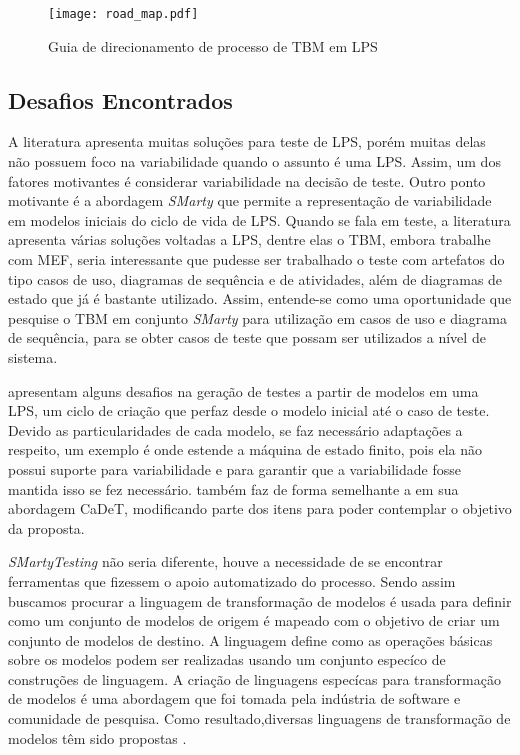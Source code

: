 \begin{landscape}
	
	\begin{figure}[htb]
		\centering
		\texttt{[image: road\_map.pdf]}
		\caption{Guia de direcionamento de processo de TBM em LPS}
		\label{fig:roadmap}
	\end{figure}
	
\end{landscape}




\subsection{Desafios Encontrados}
A literatura apresenta muitas soluções para teste de LPS, porém muitas delas não possuem foco na variabilidade quando o assunto é uma LPS. Assim, um dos fatores motivantes é considerar variabilidade na decisão de teste. Outro ponto motivante é a abordagem \textit{SMarty} \cite{junior2010systematic} que permite a representação de variabilidade em modelos iniciais do ciclo de vida de LPS. Quando se fala em teste, a literatura apresenta várias soluções voltadas a LPS, dentre elas o TBM, embora trabalhe com MEF, seria interessante que pudesse ser trabalhado o teste com artefatos do tipo casos de uso, diagramas de sequência e de atividades, além de diagramas de estado que já é bastante utilizado. Assim, entende-se como uma oportunidade que pesquise o TBM em conjunto \textit{SMarty} para utilização em casos de uso e diagrama de sequência, para se obter casos de teste que possam ser utilizados a nível de sistema.

\citealp{costa2016split, olimpiew2008model} apresentam alguns desafios na geração de testes a partir de modelos em uma LPS, um ciclo de criação que perfaz desde o modelo inicial até o caso de teste. Devido as particularidades de cada modelo, se faz necessário adaptações a respeito, um exemplo é onde \citealp{costa2016split} estende a máquina de estado finito, pois ela não possui suporte para variabilidade e para garantir que a variabilidade fosse mantida isso se fez necessário. \citealp{olimpiew2008model} também faz de forma semelhante a em sua abordagem CaDeT, modificando parte dos itens para poder contemplar o objetivo da proposta.

\textit{SMartyTesting} não seria diferente, houve a necessidade de se encontrar ferramentas que fizessem o apoio automatizado do processo. Sendo assim buscamos procurar a linguagem de transformação de modelos é usada para definir como um conjunto de modelos de origem é mapeado com o objetivo de criar um conjunto de modelos de destino. A linguagem define como as operações básicas sobre os modelos podem ser realizadas usando um conjunto especíco de construções de linguagem. A criação de linguagens especícas para transformação de modelos é uma abordagem que foi tomada pela indústria de software e comunidade de pesquisa. Como resultado,diversas linguagens de transformação de modelos têm sido propostas \citealp{allilaire2006atl}.

